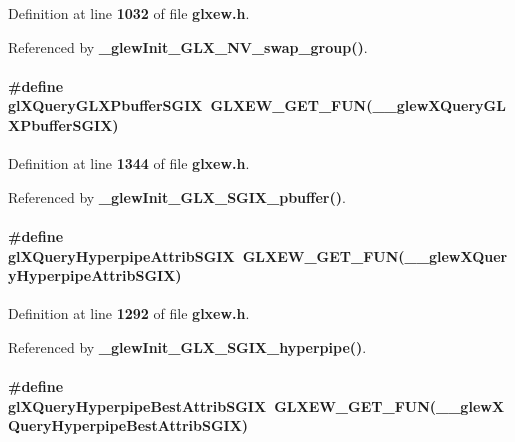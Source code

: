 Definition at line {\bf 1032} of file {\bf glxew.\+h}.



Referenced by {\bf \+\_\+glew\+Init\+\_\+\+G\+L\+X\+\_\+\+N\+V\+\_\+swap\+\_\+group()}.

\paragraph[{gl\+X\+Query\+G\+L\+X\+Pbuffer\+S\+G\+IX}]{\setlength{\rightskip}{0pt plus 5cm}\#define gl\+X\+Query\+G\+L\+X\+Pbuffer\+S\+G\+IX~{\bf G\+L\+X\+E\+W\+\_\+\+G\+E\+T\+\_\+\+F\+UN}({\bf \+\_\+\+\_\+glew\+X\+Query\+G\+L\+X\+Pbuffer\+S\+G\+IX})}\label{glxew_8h_af0b18ee2b1c4cd868fc9c3e10f78564d}


Definition at line {\bf 1344} of file {\bf glxew.\+h}.



Referenced by {\bf \+\_\+glew\+Init\+\_\+\+G\+L\+X\+\_\+\+S\+G\+I\+X\+\_\+pbuffer()}.

\paragraph[{gl\+X\+Query\+Hyperpipe\+Attrib\+S\+G\+IX}]{\setlength{\rightskip}{0pt plus 5cm}\#define gl\+X\+Query\+Hyperpipe\+Attrib\+S\+G\+IX~{\bf G\+L\+X\+E\+W\+\_\+\+G\+E\+T\+\_\+\+F\+UN}({\bf \+\_\+\+\_\+glew\+X\+Query\+Hyperpipe\+Attrib\+S\+G\+IX})}\label{glxew_8h_a236c33876cf01f7ea8b97347f97d4a9a}


Definition at line {\bf 1292} of file {\bf glxew.\+h}.



Referenced by {\bf \+\_\+glew\+Init\+\_\+\+G\+L\+X\+\_\+\+S\+G\+I\+X\+\_\+hyperpipe()}.

\paragraph[{gl\+X\+Query\+Hyperpipe\+Best\+Attrib\+S\+G\+IX}]{\setlength{\rightskip}{0pt plus 5cm}\#define gl\+X\+Query\+Hyperpipe\+Best\+Attrib\+S\+G\+IX~{\bf G\+L\+X\+E\+W\+\_\+\+G\+E\+T\+\_\+\+F\+UN}({\bf \+\_\+\+\_\+glew\+X\+Query\+Hyperpipe\+Best\+Attrib\+S\+G\+IX})}\label{glxew_8h_a4b1fa2f8c91a80b3d6141fcb932d3808}


